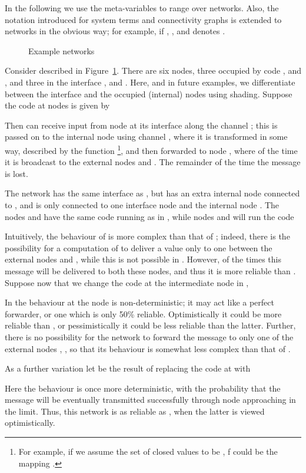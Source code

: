 \documentclass{LMCS}
\begin{document}
In the following we use the meta-variables  to 
range over networks. Also, the notation introduced for system 
terms and connectivity graphs is extended to networks in 
the obvious way; for example, if , 
,  and 
 denotes .

\begin{figure}[t]
  
                         

 
  \caption{Example networks}
  \label{fig:ex1}
\end{figure}

\begin{exa}\label{ex:ex1}
Consider  described in Figure~\ref{fig:ex1}. 
There are six nodes, three occupied by code ,  and , and three in the interface
 ,
 and . Here, and in future examples,  we  differentiate between the interface
and the occupied (internal) nodes using shading. Suppose the code at nodes is given by

Then  can receive input from node  at its interface along the channel
; this is passed on to the internal node  using channel , where it is transformed
in some way, described by the function \footnote{For example, 
if we assume the set of closed values to be , f could be the mapping 
.}, and then forwarded to node , where  of the
time it is  broadcast to the external nodes  and . The remainder of the
time the message is lost. 

The network  has the same interface as , but has an extra internal node
 connected to ,
and  is only connected to one interface node  and the internal node . The nodes  and  
have the same code running as in , while nodes  and  will run the code

Intuitively, the behaviour of  is more complex than that of ; indeed, there is the 
possibility for a computation of  to deliver a value only to one between the external nodes 
 and , while this is not possible in . However,  of the times this message 
will be delivered to both these nodes, and thus it is more reliable than .
Suppose now that we change the code at the intermediate node  in \calM, 

In  the behaviour at the node  is non-deterministic; it may act like a perfect forwarder,
or one which is only 50\% reliable.  Optimistically it could be more reliable than , or pessimistically it 
could be less reliable than the latter. Further, there is no possibility for the network  to forward 
the message  to only one of the external nodes , , so that its behaviour is somewhat less complex than 
 that of .

As a further variation let  be the result of replacing the code at  with 

Here the behaviour is once more deterministic, with the probability that the message will be
eventually transmitted successfully through node  approaching  in the limit. Thus, this 
network is as reliable as ,  when the latter is viewed optimistically.
\end{exa}
\end{document}
